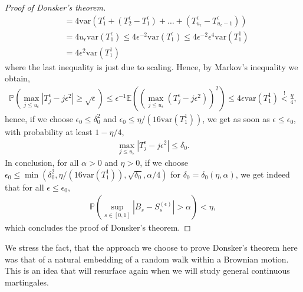 \documentclass[../mainfile.tex]{subfiles}
\begin{document}
\begin{proof}[Proof of Donsker's theorem]
\begin{align*}
&=4 \text{var}( T_1^\epsilon + (T_2^\epsilon-T_1^\epsilon) + \dots + (T_{u_\epsilon}^\epsilon-T_{u_\epsilon-1}^\epsilon)) \\
&= 4 u_\epsilon\text{var}(T_1^\epsilon) \leq 4 \epsilon^{-2} \text{var}(T_1^\epsilon) \leq 4 \epsilon^{-2} \epsilon^4\text{var}(T_1^1) \\
&= 4 \epsilon^2 \text{var}(T_1^1)
\end{align*}
where the last inequality is just due to scaling. Hence, by Markov's inequality we obtain,
\begin{align*}
\mathbb{P}( \max_{j \leq u_\epsilon} |T_j^\epsilon-j \epsilon^2| \geq \sqrt{\epsilon})  \leq \epsilon ^{-1} \mathbb{E}( (\max_{j \leq u_\epsilon} (T_j^\epsilon-j \epsilon^2))^2) \leq 4 \epsilon \text{var}(T_1^1) \overset{!}<\frac{\eta}{4},
\end{align*}
hence, if we choose $\epsilon_0 \leq \delta_0^2 $ and $\epsilon_0 \leq \eta/(16 \text{var}(T_1^1))$, we get as soon as $\epsilon \leq \epsilon_0$, with probability at least $1-\eta/4$, 
\begin{align*}
\max_{j \leq u_\epsilon} |T_j^\epsilon-j \epsilon^2| \leq \delta_0. 
\end{align*}
In conclusion, for all $\alpha>0$ and $\eta>0$, if we choose \\ $\epsilon_0 \leq \min( \delta_0^2, \eta/(16 \text{var}(T_1^1)), \sqrt{\delta_0}, \alpha/4)$ for $\delta_0=\delta_0( \eta, \alpha)$, we get indeed that for all $\epsilon \leq \epsilon_0,$ 
\begin{align*}
\mathbb{P} ( \sup_{s \in [0,1]} |B_s-S_s^{( \epsilon)} | > \alpha ) < \eta,
\end{align*}
which concludes the proof of Donsker's theorem. 
\end{proof}
\begin{rem} We stress the fact, that the approach we choose to prove Donsker's theorem here was that of a natural embedding of a random walk within a Brownian motion. This is an idea that will resurface again when we will study general continuous martingales.
\end{rem}
\newpage
\end{document}
